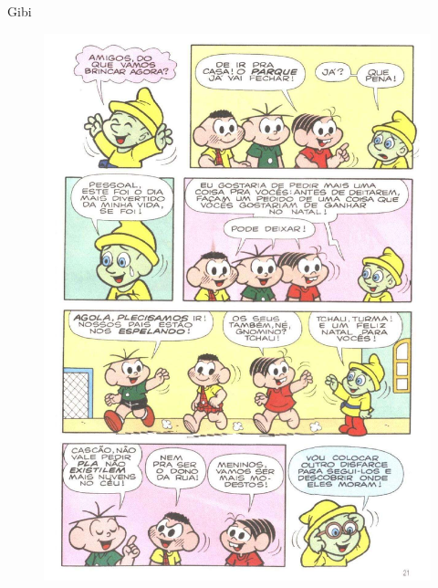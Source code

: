 \documentclass{beamer}
\begin{document}
\begin{frame}{Gibi}
\begin{figure}
    \centering
    \includegraphics[scale = 0.25]{img/page.pdf}

\end{figure}
\end{frame}
\end{document}
